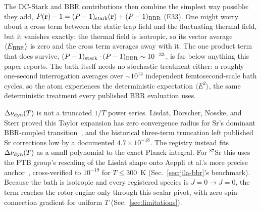 \documentclass[aps,pra,superscriptaddress,groupedaddress,nofootinbib]{revtex4-2}
\begin{document}
The DC-Stark and BBR contributions then combine the simplest way
possible: they add, $P(\mathbf{r})-1 = (P-1)_{\rm
stark}(\mathbf{r}) + (P-1)_{\rm BBR}$ (E33). One might worry about a
cross term between the static trap field and the fluctuating thermal
field, but it vanishes exactly: the thermal field is isotropic, so its
vector average $\langle E_{\rm BBR}\rangle$ is zero and the cross term
averages away with it. The one
product term that does survive, $(P-1)_{\rm stark}\cdot(P-1)_{\rm
BBR}\sim10^{-33}$, is far below anything this paper reports. The bath
itself needs no stochastic treatment either: a roughly one-second
interrogation averages over $\sim10^{14}$ independent femtosecond-scale
bath cycles, so the atom experiences the deterministic expectation
$\langle E^2\rangle$, the same deterministic treatment every published
BBR evaluation uses.

$\Delta\nu_{\rm dyn}(T)$ is not a truncated $1/T$ power series. Lisdat,
D\"orscher, Nosske, and Sterr proved this Taylor expansion has zero
convergence radius for Sr's dominant BBR-coupled
transition~\cite{Lisdat2021}, and the historical three-term truncation
left published Sr corrections low by a documented $4.7\times10^{-18}$.
The registry instead fits $\Delta\nu_{\rm dyn}(T)$ as a small polynomial
to the exact Planck integral. For $^{87}$Sr this uses the PTB group's
rescaling of the Lisdat shape onto Aeppli et al.'s more precise
anchor~\cite{Nosske2025,Aeppli2024}, cross-verified to $10^{-19}$ for
$T\le300$~K (Sec.~\ref{sec:jila-bbr}'s benchmark). Because the bath is
isotropic and every registered species is $J{=}0\!\to\!J{=}0$, the term
reaches the rotor engine only through this scalar pivot, with zero
spin-connection gradient for uniform $T$ (Sec.~\ref{sec:limitations}).
\end{document}
